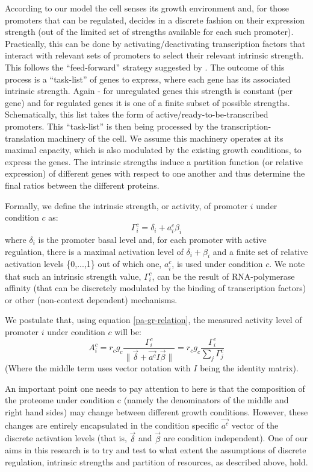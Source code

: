 \documentclass[a4page,notitlepage]{article}
\providecommand{\norm}[1]{\lVert#1\rVert}
\begin{document}
According to our model the cell senses its growth environment and, for those promoters that can be regulated, decides in a discrete fashion on their expression strength (out of the limited set of strengths available for each such promoter).
Practically, this can be done by activating/deactivating transcription factors that interact with relevant sets of promoters to select their relevant intrinsic strength.
This follows the ``feed-forward'' strategy suggested by \parencite{Levy2009}.
The outcome of this process is a ``task-list'' of genes to express, where each gene has its associated intrinsic strength.
Again - for unregulated genes this strength is constant (per gene) and for regulated genes it is one of a finite subset of possible strengths.
Schematically, this list takes the form of active/ready-to-be-transcribed promoters.
This ``task-list'' is then being processed by the transcription-translation machinery of the cell.
We assume this machinery operates at its maximal capacity, which is also modulated by the existing growth conditions, to express the genes.
The intrinsic strengths induce a partition function (or relative expression) of different genes with respect to one another and thus determine the final ratios between the different proteins.

Formally, we define the intrinsic strength, or activity, of promoter $i$ under condition $c$ as:
\[\Gamma^c_i=\delta_i+a^c_i\beta_i\]
where $\delta_i$ is the promoter basal level and, for each promoter with active regulation, there is a maximal activation level of $\delta_i+\beta_i$ and a finite set of relative activation levels \{0,...,1\} out of which one, $a^c_i$, is used under condition $c$.
We note that such an intrinsic strength value, $\Gamma^c_i$, can be the result of RNA-polymerase affinity (that can be discretely modulated by the binding of transcription factors) or other (non-context dependent) mechanisms.

We postulate that, using equation \ref{pa-gr-relation}, the measured activity level of promoter $i$ under condition $c$ will be:
\begin{equation}
\label{cond-act}
A^c_i=r_cg_c\frac{\Gamma^c_i}{\norm{\vec{\delta}+\vec{a^c}I\vec{\beta}}}=r_cg_c\frac{\Gamma^c_i}{\sum_{j}\Gamma^c_j}
\end{equation}
(Where the middle term uses vector notation with $I$ being the identity matrix).

An important point one needs to pay attention to here is that the composition of the proteome under condition c (namely the denominators of the middle and right hand sides) may change between different growth conditions.
However, these changes are entirely encapsulated in the condition specific $\vec{a^c}$ vector of the discrete activation levels (that is, $\vec{\delta}$ and $\vec{\beta}$ are condition independent).
One of our aims in this research is to try and test to what extent the assumptions of discrete regulation, intrinsic strengths and partition of resources, as described above, hold.
\end{document}
